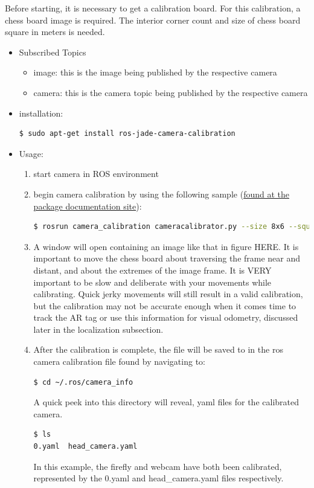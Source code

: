 \noindent Before starting, it is necessary to get a calibration board. For this calibration, a chess board image is required. The interior corner count and size of chess board square in meters is needed.
\begin{itemize}
\item Subscribed Topics
\begin{itemize}
\item image: this is the image being published by the respective camera 
\item camera: this is the camera topic being published by the respective camera
\end{itemize}
\item installation:
\begin{lstlisting}[language=bash]
$ sudo apt-get install ros-jade-camera-calibration
\end{lstlisting}
\item Usage:
\begin{enumerate}
\item start camera in ROS environment
\item begin camera calibration by using the following sample (\href{http://wiki.ros.org/camera_calibration}{found at the package documentation site}):
\begin{lstlisting}[language=bash]
$ rosrun camera_calibration cameracalibrator.py --size 8x6 --square 0.108 image:=/my_camera/image camera:=/my_camera
\end{lstlisting}
\item A window will open containing an image like that in figure HERE. It is important to move the chess board about traversing the frame near and distant, and about the extremes of the image frame. It is VERY important to be slow and deliberate with your movements while calibrating. Quick jerky movements will still result in a valid calibration, but the calibration may not be accurate enough when it comes time to track the AR tag or use this information for visual odometry, discussed later in the localization subsection.
\item After the calibration is complete, the file will be saved to in the ros camera calibration file found by navigating to:
\begin{lstlisting}[language=bash]
$ cd ~/.ros/camera_info
\end{lstlisting}

A quick peek into this directory will reveal, yaml files for the calibrated camera.
\begin{lstlisting}[language=bash]
$ ls
0.yaml	head_camera.yaml
\end{lstlisting}
In this example, the firefly and webcam have both been calibrated, represented by the 0.yaml and head\_camera.yaml files respectively.\par


\end{enumerate}
\end{itemize}
